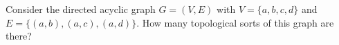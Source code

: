 \begin{prob}
    Consider the directed acyclic graph $G = (V, E)$ with $V = \{a, b, c, d\}$
    and $E = \{(a, b), (a,c), (a,d)\}$. How many topological sorts of this
    graph are there?

\end{prob}
